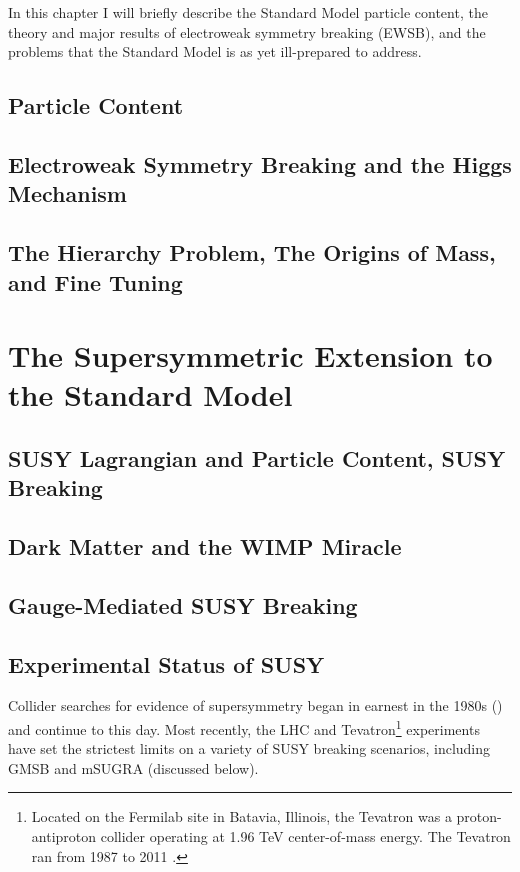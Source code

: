 \documentclass[12pt, letterpaper]{report}
\begin{document}
In this chapter I will briefly describe the Standard Model particle content, the theory and major results of electroweak symmetry breaking (EWSB), and the problems that the Standard Model is as yet ill-prepared to address.

\section{Particle Content}
\section{Electroweak Symmetry Breaking and the Higgs Mechanism}
\section{The Hierarchy Problem, The Origins of Mass, and Fine Tuning}

\chapter{The Supersymmetric Extension to the Standard Model}
\section{SUSY Lagrangian and Particle Content, SUSY Breaking}
\section{Dark Matter and the WIMP Miracle}
\section{Gauge-Mediated SUSY Breaking}
\section{Experimental Status of SUSY}

Collider searches for evidence of supersymmetry began in earnest in the 1980s (\cite{SUSY_history}) and continue to this day.  Most recently, the LHC and Tevatron\footnote{Located on the Fermilab site in Batavia, Illinois, the Tevatron was a proton-antiproton collider operating at 1.96 TeV center-of-mass energy.  The Tevatron ran from 1987 to 2011 \cite{Tevatron_lifetime}.} experiments have set the strictest limits on a variety of SUSY breaking scenarios, including GMSB and mSUGRA (discussed below).
\end{document}
